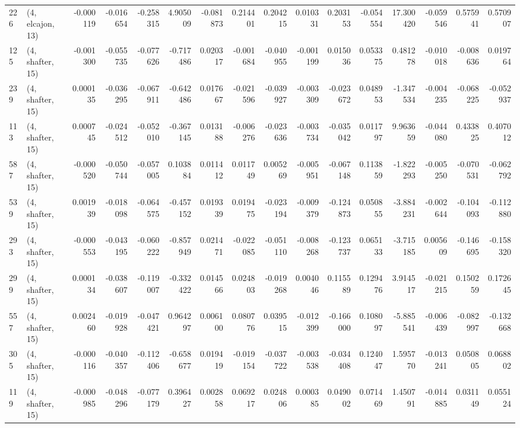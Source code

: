\begin{tabular}{llrrrrrrrrrrrrrr}
226 &  (4, elcajon, 13) &  -0.000119 & -0.016654 & -0.258315 &    4.905009 & -0.081873 &   0.214401 &  0.204215 &  0.010331 &  0.203153 & -0.054554 &   17.300420 & -0.059546 &  0.575941 &  0.570907 \\
125 &  (4, shafter, 15) &  -0.001300 & -0.055735 & -0.077626 &   -0.717486 &  0.020317 &  -0.001684 & -0.040955 & -0.001199 &  0.015036 &  0.053375 &    0.481278 & -0.010018 & -0.008636 &  0.019764 \\
239 &  (4, shafter, 15) &   0.000135 & -0.036295 & -0.067911 &   -0.642486 &  0.017667 &  -0.021596 & -0.039927 & -0.003309 & -0.023672 &  0.048953 &   -1.347534 & -0.004235 & -0.068225 & -0.052937 \\
113 &  (4, shafter, 15) &   0.000745 & -0.024512 & -0.052010 &   -0.367145 &  0.013188 &  -0.006276 & -0.023636 & -0.003734 & -0.035042 &  0.011797 &    9.963659 & -0.044080 &  0.433825 &  0.407012 \\
587 &  (4, shafter, 15) &  -0.000520 & -0.050744 & -0.057005 &    0.103884 &  0.011412 &   0.011749 &  0.005269 & -0.005951 & -0.067148 &  0.113859 &   -1.822293 & -0.005250 & -0.070531 & -0.062792 \\
539 &  (4, shafter, 15) &   0.001939 & -0.018098 & -0.064575 &   -0.457152 &  0.019339 &   0.019475 & -0.023194 & -0.009379 & -0.124873 &  0.050855 &   -3.884231 & -0.002644 & -0.104093 & -0.112880 \\
293 &  (4, shafter, 15) &  -0.000553 & -0.043195 & -0.060222 &   -0.857949 &  0.021471 &  -0.022085 & -0.051110 & -0.008268 & -0.123737 &  0.065133 &   -3.715185 &  0.005609 & -0.146695 & -0.158320 \\
299 &  (4, shafter, 15) &   0.000134 & -0.038607 & -0.119007 &   -0.332422 &  0.014566 &   0.024803 & -0.019268 &  0.004046 &  0.115589 &  0.129476 &    3.914517 & -0.021215 &  0.150259 &  0.172645 \\
557 &  (4, shafter, 15) &   0.002460 & -0.019928 & -0.047421 &    0.964297 &  0.006100 &   0.080776 &  0.039515 & -0.012399 & -0.166000 &  0.108097 &   -5.885541 & -0.006439 & -0.082997 & -0.132668 \\
305 &  (4, shafter, 15) &  -0.000116 & -0.040357 & -0.112406 &   -0.658677 &  0.019419 &  -0.019154 & -0.037722 & -0.003538 & -0.034408 &  0.124047 &    1.595770 & -0.013241 &  0.050805 &  0.068802 \\
119 &  (4, shafter, 15) &  -0.000985 & -0.048296 & -0.077179 &    0.396427 &  0.002858 &   0.069217 &  0.024806 &  0.000385 &  0.049002 &  0.071469 &    1.450791 & -0.014885 &  0.031149 &  0.055124 \\

\end{tabular}
